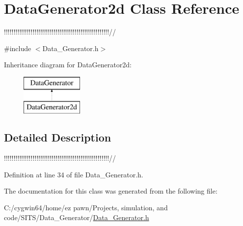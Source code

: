 \hypertarget{class_data_generator2d}{}\section{Data\+Generator2d Class Reference}
\label{class_data_generator2d}


!!!!!!!!!!!!!!!!!!!!!!!!!!!!!!!!!!!!!!!!!!!!!!!!!!!!!!!//  




{\ttfamily \#include $<$Data\+\_\+\+Generator.\+h$>$}

Inheritance diagram for Data\+Generator2d\+:\begin{figure}[H]
\begin{center}
\leavevmode
\includegraphics[height=2.000000cm]{class_data_generator2d}
\end{center}
\end{figure}


\subsection{Detailed Description}
!!!!!!!!!!!!!!!!!!!!!!!!!!!!!!!!!!!!!!!!!!!!!!!!!!!!!!!// 

Definition at line 34 of file Data\+\_\+\+Generator.\+h.



The documentation for this class was generated from the following file\+:\begin{DoxyCompactItemize}
\item 
C\+:/cygwin64/home/ez pawn/\+Projects, simulation, and code/\+S\+I\+T\+S/\+Data\+\_\+\+Generator/\hyperlink{_data___generator_8h}{Data\+\_\+\+Generator.\+h}\end{DoxyCompactItemize}
